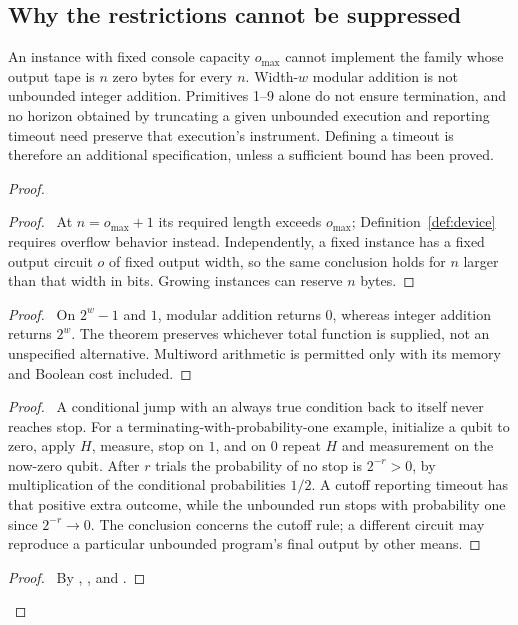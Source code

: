 \subsection{Why the restrictions cannot be suppressed}

\begin{proposition}
\label{eqv:restrictions}
An instance with fixed console capacity $o_{\max}$ cannot implement the family
whose output tape is $n$ zero bytes for every $n$. Width-$w$ modular
addition is not unbounded integer addition. Primitives 1--9 alone
do not ensure termination, and no horizon obtained by truncating a given unbounded execution and reporting timeout need preserve that execution's instrument. Defining a timeout is therefore an
additional specification, unless a sufficient bound has been proved.
\end{proposition}
\begin{proof}
 \begin{proof}\pf\ At $n=o_{\max}+1$ its required length exceeds $o_{\max}$;
 Definition~\ref{def:device} requires overflow behavior instead. Independently, a fixed instance has a fixed output circuit $o$ of fixed output width, so the same conclusion holds for $n$ larger than that width in bits.
 Growing instances can reserve $n$ bytes.\end{proof}
 \begin{proof}\pf\ On $2^w-1$ and $1$, modular addition returns
 $0$, whereas integer addition returns $2^w$. The theorem preserves
 whichever total function is supplied, not an unspecified alternative.
 Multiword arithmetic is permitted only with its memory and Boolean
 cost included.\end{proof}
 \begin{proof}\pf\ A conditional jump with an always true condition
 back to itself never reaches stop. For a terminating-with-probability-one
 example, initialize a qubit to zero, apply $H$, measure, stop on $1$,
 and on $0$ repeat $H$ and measurement on the now-zero qubit. After
 $r$ trials the probability of no stop is $2^{-r}>0$, by multiplication
 of the conditional probabilities $1/2$. A cutoff reporting timeout
 has that positive extra outcome, while the unbounded run stops
 with probability one since $2^{-r}\to0$. The conclusion concerns
 the cutoff rule; a different circuit may reproduce a particular
 unbounded program's final output by other means.\end{proof}
 \qedstep
 \begin{proof}\pf\ By ,
 , and .\end{proof}
\end{proof}

